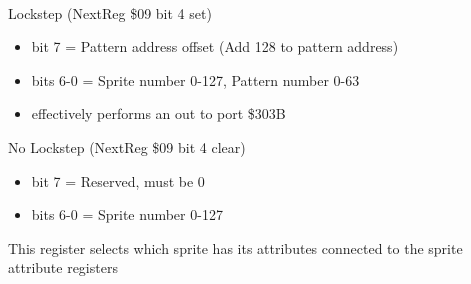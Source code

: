 \\
Lockstep (NextReg \$09 bit 4 set)
\begin{itemize}
\item bit 7 = Pattern address offset (Add 128 to pattern address)
\item bits 6-0 = Sprite number 0-127, Pattern number 0-63
\item[] effectively performs an out to port \$303B
\end{itemize}
No Lockstep (NextReg \$09 bit 4 clear)
\begin{itemize}
\item bit 7 = Reserved, must be 0
\item bits 6-0 = Sprite number 0-127
\end{itemize}
This register selects which sprite has its attributes connected to the
sprite attribute registers

